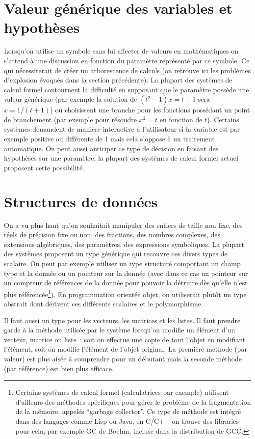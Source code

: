 \documentclass[a4paper,11pt]{book}
\begin{document}
\begin{giacjshere}
\section{Valeur générique des variables et
  hypothèses} 
Lorsqu'on utilise un symbole sans lui affecter de valeurs en mathématiques 
on s'attend à une discussion en fonction du 
paramètre représenté par ce symbole. Ce qui nécessiterait de créer un 
arborescence de calculs (on retrouve ici les problèmes 
d'explosion évoqués dans la section précédente). 
La plupart des systèmes de calcul formel contournent la difficulté en 
supposant que le paramètre possède une valeur 
générique (par exemple la solution de $(t^2-1)x=t-1$ sera $x=1/(t+1)$) ou 
choisissent une branche pour les fonctions 
possédant un point de branchement (par exemple pour résoudre $x^2=t$ 
en fonction de $t$). Certains systèmes demandent de 
manière interactive à l'utilisateur si la variable est par exemple positive 
ou différente de 1 mais cela s'oppose à un 
traitement automatique. 
On peut aussi anticiper ce type de décision en faisant des hypothèses
sur une paramètre, la plupart des systèmes de calcul formel actuel
proposent cette possibilité.

\section{Structures de données}
On a vu plus haut qu'on souhaitait manipuler des entiers de taille non 
fixe, des réels de précision fixe ou non, des
fractions, des nombres complexes, des extensions algébriques, des 
paramètres, des expressions symboliques. La plupart des syst\`emes
proposent un type générique qui recouvre ces divers types de scalaire.
On peut par exemple utiliser un type structuré comportant un champ
type et la donnée ou un pointeur sur la donnée (avec dans ce cas un 
pointeur sur un compteur de références de la donnée
pour pouvoir la détruire dès qu'elle n'est plus référencée\footnote{Certains
systèmes de calcul formel (calculatrices par exemple) utilisent d'ailleurs des
méthodes spécifiques pour gérer le problème de la fragmentation de
la mémoire, appelés ``garbage collector''. Ce type de méthode
est intégré dans des langages comme Lisp ou Java, en C/C++ on trouve
des libraries pour cela, par exemple GC de Boehm, incluse dans la
distribution de GCC.}). 
En programmation orientée objet, on utiliserait plutôt un
type abstrait dont dérivent ces différents scalaires et le polymorphisme.

Il faut aussi un type pour les vecteurs, les matrices et les
listes. Il faut prendre garde \`a la m\'ethode utilis\'ee
par le syst\`eme lorsqu'on modifie un \'el\'ement
d'un vecteur, matrice ou liste~: soit on effectue une copie de tout
l'objet en modifiant l'\'el\'ement, soit on modifie l'\'el\'ement
de l'objet original. La premi\`ere m\'ethode (par valeur) est
plus ais\'ee \`a comprendre pour un d\'ebutant mais
la seconde m\'ethode (par r\'ef\'erence) est bien plus efficace.


\end{giacjshere}
\end{document}

